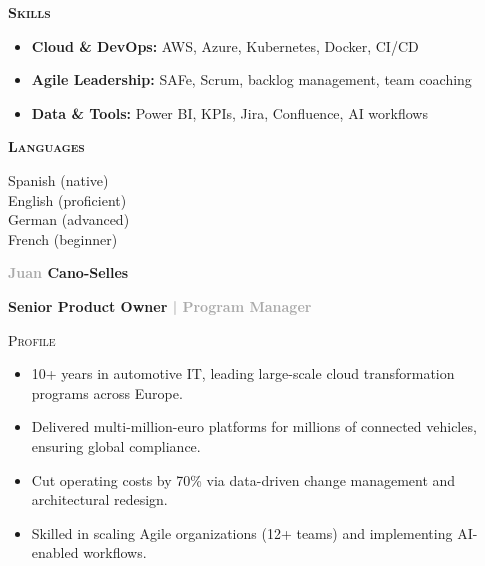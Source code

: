 \documentclass[11pt,a4paper]{article}
\newcommand{\headleft}[1]{\vspace*{2ex}\textsc{\textbf{\color{softwhite}#1}}\par%
  \vspace*{-1.2ex}{\color{softwhite}\hrulefill}\par\vspace*{0.7ex}}
\newcommand{\headright}[1]{\vspace{1.6ex}\textsc{\large\color{cvblue}#1}\par%
  \vspace*{-0.6ex}{\color{cvblue}\hrulefill}\par\vspace*{0.4ex}}
\newlength{\SideBarW}
\begin{document}
\begin{minipage}[t]{\textwidth}
{{\begin{minipage}[t]{\dimexpr\linewidth-8mm\relax}
      \headleft{Skills}
      \begin{itemize}[leftmargin=*,itemsep=0.4ex]
        \item \textbf{Cloud \& DevOps:} AWS, Azure, Kubernetes, Docker, CI/CD
        \item \textbf{Agile Leadership:} SAFe, Scrum, backlog management, team coaching
        \item \textbf{Data \& Tools:} Power BI, KPIs, Jira, Confluence, AI workflows
      \end{itemize}

      \headleft{Languages}
      Spanish (native) \\[0.4ex]
      English (proficient) \\[0.4ex]
      German (advanced) \\[0.4ex]
      French (beginner)

    \end{minipage}
  }%
}%
\hspace{4mm}%
\begin{minipage}[t]{\dimexpr\textwidth-\SideBarW-4mm\relax}
  \raggedright
  \setlength{\parskip}{0.5ex}

  \vspace*{6mm}
  {\sffont\bfseries\fontsize{50}{52}\selectfont \textcolor{darkgray}{Juan} \textcolor{cvblue}{Cano-Selles}}\par
  \vspace{1.5ex} %
  {\sffont\fontsize{18}{20}\selectfont\bfseries\textcolor{cvblue}{Senior Product Owner} \textcolor{darkgray}{| Program Manager}}\par

  \headright{Profile}
  \vspace*{-1.0ex} %
  \begin{itemize}[left=1.2em,itemsep=0.15ex]
    \item 10+ years in automotive IT, leading large-scale cloud transformation programs across Europe.
    \item Delivered multi-million-euro platforms for millions of connected vehicles, ensuring global compliance.
    \item Cut operating costs by 70\% via data-driven change management and architectural redesign.
    \item Skilled in scaling Agile organizations (12+ teams) and implementing AI-enabled workflows.
  \end{itemize}


\end{minipage}
\end{minipage}
\end{document}
